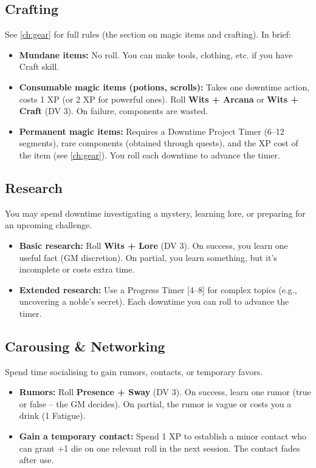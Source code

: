 \subsection{Crafting}
\label{subsec:downtime-crafting}
See \ref{ch:gear} for full rules (the section on magic items and crafting). In brief:
\begin{itemize}
  \item \textbf{Mundane items:} No roll. You can make tools, clothing, etc. if you have Craft skill.
  \item \textbf{Consumable magic items (potions, scrolls):} Takes one downtime action, costs 1 XP (or 2 XP for powerful ones). Roll \textbf{Wits + Arcana} or \textbf{Wits + Craft} (DV 3). On failure, components are wasted.
  \item \textbf{Permanent magic items:} Requires a Downtime Project Timer (6--12 segments), rare components (obtained through quests), and the XP cost of the item (see \ref{ch:gear}). You roll each downtime to advance the timer.
\end{itemize}

\subsection{Research}
You may spend downtime investigating a mystery, learning lore, or preparing for an upcoming challenge.

\begin{itemize}
  \item \textbf{Basic research:} Roll \textbf{Wits + Lore} (DV 3). On success, you learn one useful fact (GM discretion). On partial, you learn something, but it's incomplete or costs extra time.
  \item \textbf{Extended research:} Use a Progress Timer [4--8] for complex topics (e.g., uncovering a noble's secret). Each downtime you can roll to advance the timer.
\end{itemize}

\subsection{Carousing \& Networking}
Spend time socialising to gain rumors, contacts, or temporary favors.

\begin{itemize}
  \item \textbf{Rumors:} Roll \textbf{Presence + Sway} (DV 3). On success, learn one rumor (true or false -- the GM decides). On partial, the rumor is vague or costs you a drink (1 Fatigue).
  \item \textbf{Gain a temporary contact:} Spend 1 XP to establish a minor contact who can grant +1 die on one relevant roll in the next session. The contact fades after use.
\end{itemize}

